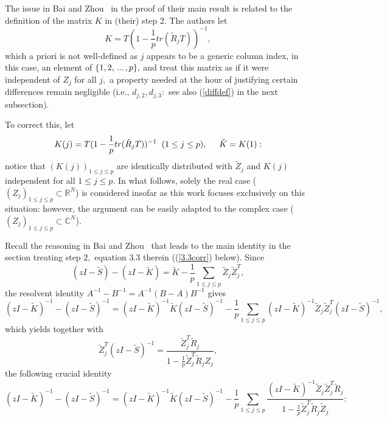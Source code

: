 \documentclass{article}
\numberwithin{equation}{section}
\begin{document}
The issue in Bai and Zhou~\cite{baizhou} in the proof of their main result is related to the definition of the matrix \(K\) in (their) step \(2.\) The authors let 
\[K=T(1-\frac{1}{p}tr(\tilde{R}_jT))^{-1},\] 
which a priori is not well-defined as \(j\) appears to be a generic column index, in this case, an element of \(\{1,2,\hspace{0.05cm}...\hspace{0.05cm},p\},\) and treat this matrix as if it were independent of \(Z_j\) for all \(j,\) %
a property needed at the hour of justifying certain differences remain negligible (i.e., \(d_{j,2},d_{j,3}:\) see also (\ref{diffdef}) in the next subsection). %
\par
To correct this, let 
\[K(j)=T(1-\frac{1}{p}tr(\tilde{R}_jT))^{-1} \hspace{0.2cm} (1 \leq j \leq p), \hspace{0.5cm} \tilde{K}=K(1):\]
notice that \((K(j))_{1 \leq j \leq p}\) are identically distributed with \(\tilde{Z}_j\) and \(K(j)\) independent for all \(1 \leq j \leq p.\) In what follows, solely the real case (\((Z_j)_{1 \leq j \leq p} \subset \mathbb{R}^N\)) is considered insofar as this work focuses exclusively on this situation: however, the argument can be easily adapted to the complex case (\((Z_j)_{1 \leq j \leq p} \subset \mathbb{C}^N\)). 
\par
Recall the reasoning in Bai and Zhou~\cite{baizhou} that leads to the main identity in the section treating step \(2,\) equation \(3.3\) therein ((\ref{3.3corr}) below). Since
\[(zI-\tilde{S})-(zI-\tilde{K})=\tilde{K}-\frac{1}{p}\sum_{1 \leq j \leq p}{\tilde{Z}_j\tilde{Z}_j^T},\]
the resolvent identity \(A^{-1}-B^{-1}=A^{-1}(B-A)B^{-1}\) gives
\[(zI-\tilde{K})^{-1}-(zI-\tilde{S})^{-1}=(zI-\tilde{K})^{-1}\tilde{K}(zI-\tilde{S})^{-1}-\frac{1}{p}\sum_{1 \leq j \leq p}{(zI-\tilde{K})^{-1}\tilde{Z}_j\tilde{Z}_j^T(zI-\tilde{S})^{-1}},\]
which yields together with 
\begin{equation}\label{multid}
    \tilde{Z}_j^T(zI-\tilde{S})^{-1}=\frac{\tilde{Z}_j^T\tilde{R}_j}{1-\frac{1}{p}\tilde{Z}_j^T\tilde{R}_jZ_j},
\end{equation}
the following crucial identity
\begin{equation}\tag{\(BZ\)}\label{3.3corr}
    (zI-\tilde{K})^{-1}-(zI-\tilde{S})^{-1}=(zI-\tilde{K})^{-1}\tilde{K}(zI-\tilde{S})^{-1}-\frac{1}{p}\sum_{1 \leq j \leq p}{\frac{(zI-\tilde{K})^{-1}\tilde{Z}_j\tilde{Z}_j^T\tilde{R}_j}{1-\frac{1}{p}\tilde{Z}_j^T\tilde{R}_j\tilde{Z}_j}}:
\end{equation}
\end{document}
